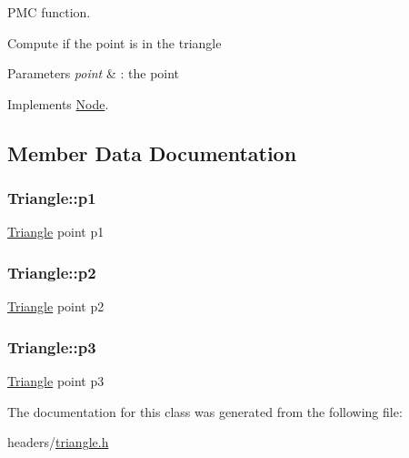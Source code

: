 \-P\-M\-C function. 

\-Compute if the point is in the triangle


\begin{DoxyParams}{\-Parameters}
{\em point} & \-: the point \\
\hline
\end{DoxyParams}


\-Implements \hyperlink{class_node_aeecdf01a88be40840b65eb34cecc7a3c}{\-Node}.



\subsection{\-Member \-Data \-Documentation}
\hypertarget{class_triangle_adebd4b41a74691d5da67db5c8f852672}{
\subsubsection[{p1}]{ {\bf \-Triangle\-::p1}}}
\label{class_triangle_adebd4b41a74691d5da67db5c8f852672}
\hyperlink{class_triangle}{\-Triangle} point p1 \hypertarget{class_triangle_a7bba48c61a088c93914768018b2329af}{
\subsubsection[{p2}]{ {\bf \-Triangle\-::p2}}}
\label{class_triangle_a7bba48c61a088c93914768018b2329af}
\hyperlink{class_triangle}{\-Triangle} point p2 \hypertarget{class_triangle_a7df8e8ed225f77daee7e5eb4bf5b9f99}{
\subsubsection[{p3}]{ {\bf \-Triangle\-::p3}}}
\label{class_triangle_a7df8e8ed225f77daee7e5eb4bf5b9f99}
\hyperlink{class_triangle}{\-Triangle} point p3 

\-The documentation for this class was generated from the following file\-:\begin{DoxyCompactItemize}
\item 
headers/\hyperlink{triangle_8h}{triangle.\-h}\end{DoxyCompactItemize}
